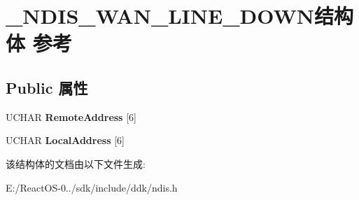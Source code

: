 \hypertarget{struct___n_d_i_s___w_a_n___l_i_n_e___d_o_w_n}{}\section{\+\_\+\+N\+D\+I\+S\+\_\+\+W\+A\+N\+\_\+\+L\+I\+N\+E\+\_\+\+D\+O\+W\+N结构体 参考}
\label{struct___n_d_i_s___w_a_n___l_i_n_e___d_o_w_n}
\subsection*{Public 属性}
\begin{DoxyCompactItemize}
\item 
\mbox{\label{struct___n_d_i_s___w_a_n___l_i_n_e___d_o_w_n_afe6b3c05ff6cd0af145413071a1719d9}} 
U\+C\+H\+AR {\bfseries Remote\+Address} \mbox{[}6\mbox{]}
\item 
\mbox{\label{struct___n_d_i_s___w_a_n___l_i_n_e___d_o_w_n_a90561197ddda3ef4ef51d76d5cf95f4a}} 
U\+C\+H\+AR {\bfseries Local\+Address} \mbox{[}6\mbox{]}
\end{DoxyCompactItemize}


该结构体的文档由以下文件生成\+:\begin{DoxyCompactItemize}
\item 
E\+:/\+React\+O\+S-\/0../sdk/include/ddk/ndis.\+h\end{DoxyCompactItemize}
